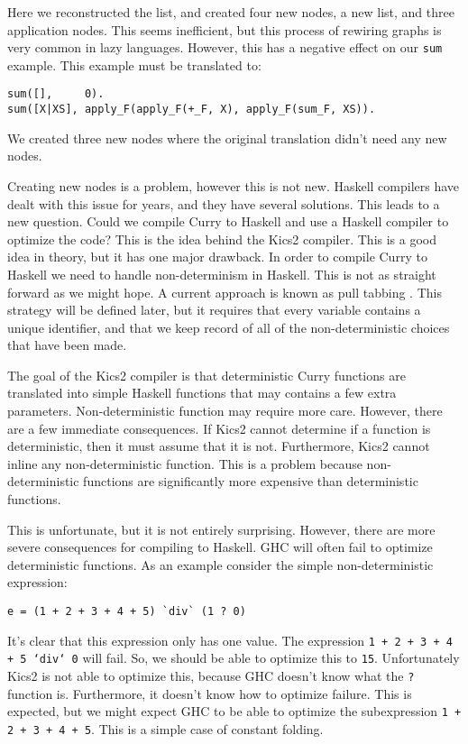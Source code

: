 Here we reconstructed the list, and created four new nodes, a new list, and three application nodes.
This seems inefficient, but this process of rewiring graphs is very common in lazy languages.
However, this has a negative effect on our \texttt{sum} example.
This example must be translated to:
\begin{verbatim}
sum([],     0).
sum([X|XS], apply_F(apply_F(+_F, X), apply_F(sum_F, XS)).
\end{verbatim}
We created three new nodes where the original translation didn't need any new nodes.

Creating new nodes is a problem, however this is not new.
Haskell compilers have dealt with this issue for years, and they have several solutions.
This leads to a new question.
Could we compile Curry to Haskell and use a Haskell compiler to optimize the code?
This is the idea behind the Kics2 compiler.
This is a good idea in theory, but it has one major drawback.
In order to compile Curry to Haskell we need to handle non-determinism in Haskell.
This is not as straight forward as we might hope.
A current approach is known as pull tabbing \cite{Antoy11ICLP}.
This strategy will be defined later, but it requires that every variable contains a unique identifier,
and that we keep record of all of the non-deterministic choices that have been made.

The goal of the Kics2 compiler is that deterministic Curry functions are translated into simple Haskell functions
that may contains a few extra parameters.
Non-deterministic function may require more care.
However, there are a few immediate consequences.
If Kics2 cannot determine if a function is deterministic, then it must assume that it is not.
Furthermore, Kics2 cannot inline any non-deterministic function.
This is a problem because non-deterministic functions are significantly more expensive than deterministic functions.

This is unfortunate, but it is not entirely surprising.
However, there are more severe consequences for compiling to Haskell.
GHC will often fail to optimize deterministic functions.
As an example consider the simple non-deterministic expression:
\begin{verbatim}
e = (1 + 2 + 3 + 4 + 5) `div` (1 ? 0)
\end{verbatim}
It's clear that this expression only has one value.  The expression \texttt{1 + 2 + 3 + 4 + 5 `div` 0} will fail.
So, we should be able to optimize this to \texttt{15}.
Unfortunately Kics2 is not able to optimize this, because GHC doesn't know what the \texttt ? function is.
Furthermore, it doesn't know how to optimize failure.
This is expected, but we might expect GHC to be able to optimize the subexpression \texttt{1 + 2 + 3 + 4 + 5}.
This is a simple case of constant folding.

